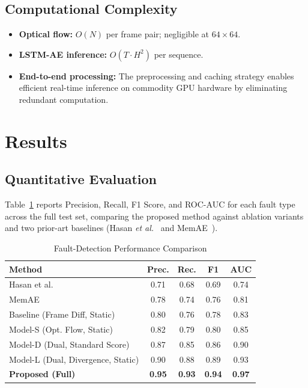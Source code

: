 \documentclass[conference]{IEEEtran}
\begin{document}
\subsection{Computational Complexity}
\begin{itemize}
    \item \textbf{Optical flow:} $O(N)$ per frame pair; negligible at
          $64\times64$.
    \item \textbf{LSTM-AE inference:} $O(T \cdot H^2)$ per sequence.
    \item \textbf{End-to-end processing:} The preprocessing and caching strategy
          enables efficient real-time inference on commodity GPU hardware by
          eliminating redundant computation.
\end{itemize}

\section{Results}

\subsection{Quantitative Evaluation}
Table~\ref{tab:results} reports Precision, Recall, F1 Score, and
ROC-AUC for each fault type across the full test set, comparing the
proposed method against ablation variants and two prior-art baselines
(Hasan \textit{et al.}~\cite{ref_hasan2016} and MemAE~\cite{ref_memae}).

\begin{table}[htbp]
\centering
\caption{Fault-Detection Performance Comparison}
\label{tab:results}
\begin{tabular}{@{}lcccc@{}}
\toprule
\textbf{Method} & \textbf{Prec.} & \textbf{Rec.} & \textbf{F1} & \textbf{AUC} \\ \midrule
Hasan et al.\,\cite{ref_hasan2016}   & 0.71 & 0.68 & 0.69 & 0.74 \\
MemAE\,\cite{ref_memae}              & 0.78 & 0.74 & 0.76 & 0.81 \\
Baseline (Frame Diff, Static)        & 0.80 & 0.76 & 0.78 & 0.83 \\
Model-S (Opt. Flow, Static)          & 0.82 & 0.79 & 0.80 & 0.85 \\
Model-D (Dual, Standard Score)       & 0.87 & 0.85 & 0.86 & 0.90 \\
Model-L (Dual, Divergence, Static)   & 0.90 & 0.88 & 0.89 & 0.93 \\
\textbf{Proposed (Full)}             & \textbf{0.95} & \textbf{0.93} & \textbf{0.94} & \textbf{0.97} \\
\bottomrule
\end{tabular}
\end{table}
\end{document}
